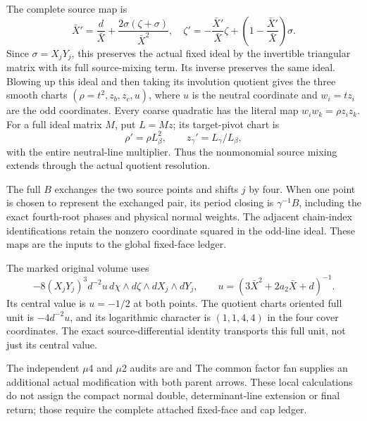 The complete source map is
\[
 \bar X'=\frac d{\bar X}
           +\frac{2\sigma(\zeta+\sigma)}{\bar X^2},\quad
 \zeta'=-\frac{\bar X'}{\bar X}\zeta
            +\left(1-\frac{\bar X'}{\bar X}\right)\sigma .
 \tag{ASI.2}
\]
Since \(\sigma=X_jY_j\), this preserves the
actual fixed ideal by the invertible triangular
matrix with its full source-mixing term.
Its inverse preserves the same ideal.
Blowing up this ideal and then taking its
involution quotient gives the three smooth
charts
\((\rho=t^2,z_b,z_c,u)\), where \(u\) is
the neutral coordinate and \(w_i=tz_i\)
are the odd coordinates. Every coarse
quadratic has the literal map
\(w_iw_k=\rho z_i z_k\).
For a full ideal matrix \(M\), put
\(L=Mz\); its target-pivot chart is
\[
 \rho'=\rho L_\beta^2,\qquad
 z_\gamma'=L_\gamma/L_\beta ,
 \tag{ASI.3}
\]
with the entire neutral-line multiplier.
Thus the nonmonomial source mixing extends
through the actual quotient resolution.

The full \(B\) exchanges the two source
points and shifts \(j\) by four. When one
point is chosen to represent the exchanged
pair, its period closing is
\(\gamma^{-1}B\), including the exact
fourth-root phases and physical normal
weights. The adjacent chain-index
identifications retain the nonzero
coordinate squared in the odd-line
ideal. These maps are the inputs to
the global fixed-face ledger.

The marked original volume uses
\[
 -8(X_jY_j)^3d^{-2}u\,
        d\chi\wedge d\zeta\wedge dX_j\wedge dY_j,
 \qquad u=(3\bar X^2+2a_2\bar X+d)^{-1}.
 \tag{ASI.4}
\]
Its central value is \(u=-1/2\) at both
points. The quotient chart\textquotesingle s oriented
full unit is \(-4d^{-2}u\), and its
logarithmic character is \((1,1,4,4)\)
in the four cover coordinates.
The exact source-differential identity
transports this full unit, not just
its central value.

The independent \ensuremath{\mu}4 and \ensuremath{\mu}2 audits are
and 
The common factor fan supplies an additional actual
modification with both parent arrows. These local
calculations do not assign the compact normal
double, determinant-line extension or final return;
those require the complete attached fixed-face
and cap ledger.

